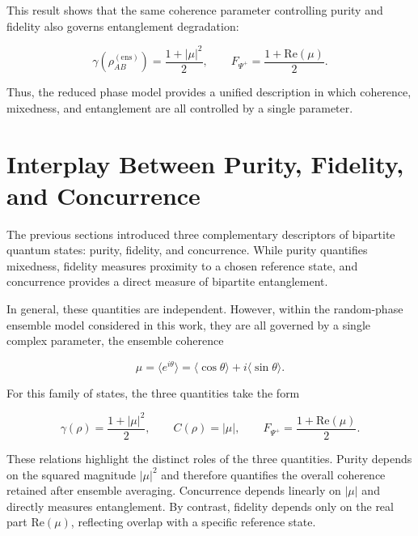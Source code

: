 This result shows that the same coherence parameter controlling purity and fidelity also governs entanglement degradation:

\[
\gamma
\left(
\rho_{AB}^{(\mathrm{ens})}
\right)
=
\frac{1+|\mu|^2}{2},
\qquad
F_{\Psi^+}
=
\frac{1+\mathrm{Re}(\mu)}{2}.
\]

Thus, the reduced phase model provides a unified description in which coherence, mixedness, and entanglement are all controlled by a single parameter.


\section{Interplay Between Purity, Fidelity, and Concurrence}

The previous sections introduced three complementary descriptors of bipartite quantum states: purity, fidelity, and concurrence. While purity quantifies mixedness, fidelity measures proximity to a chosen reference state, and concurrence provides a direct measure of bipartite entanglement.

\medskip

In general, these quantities are independent. However, within the random-phase ensemble model considered in this work, they are all governed by a single complex parameter, the ensemble coherence

\begin{equation}
\mu
=
\langle e^{i\theta}\rangle
=
\langle \cos\theta\rangle
+
i\langle \sin\theta\rangle.
\label{eq:coherence_parameter_trigonometric}
\end{equation}

\medskip

For this family of states, the three quantities take the form

\begin{equation}
\gamma(\rho)
=
\frac{1+|\mu|^2}{2},
\qquad
C(\rho)
=
|\mu|,
\qquad
F_{\Psi^+}
=
\frac{1+\mathrm{Re}(\mu)}{2}.
\label{eq:purity_concurrence_fidelity_mu}
\end{equation}

\medskip

These relations highlight the distinct roles of the three quantities. Purity depends on the squared magnitude \( |\mu|^2 \) and therefore quantifies the overall coherence retained after ensemble averaging. Concurrence depends linearly on \( |\mu| \) and directly measures entanglement. By contrast, fidelity depends only on the real part \( \mathrm{Re}(\mu) \), reflecting overlap with a specific reference state.

